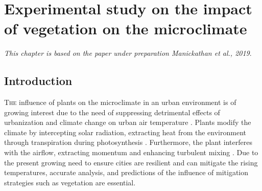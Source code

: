 \chapter{Experimental study on the impact of vegetation on the microclimate}
\label{ch:microclimatestudy}
\def\figdir{chapters/ch05_microclimatestudy/figures/}

\textit{This chapter is based on the paper under preparation Manickathan et al., 2019}.

\section{Introduction}

\lettrine[lines=3,nindent=0em,loversize=0.1]{T}{he} influence of plants on the microclimate in an urban environment is of growing interest due to the need of suppressing detrimental effects of urbanization and climate change on urban air temperature \citep{Chen2006,Demuzere2014,Dimoudi2003,Matthews2017,Shashua-Bar2009b,Shashua-Bar2000a}. Plants modify the climate by intercepting solar radiation, extracting heat from the environment through transpiration during photosynthesis \citep{nobel2009physicochemical}. Furthermore, the plant interferes with the airflow, extracting momentum and enhancing turbulent mixing \citep{Finnigan2009, Gromke2014, Sanz2003}. Due to the present growing need to ensure cities are resilient and can mitigate the rising temperatures, accurate analysis, and predictions of the influence of mitigation strategies such as vegetation are essential. 

